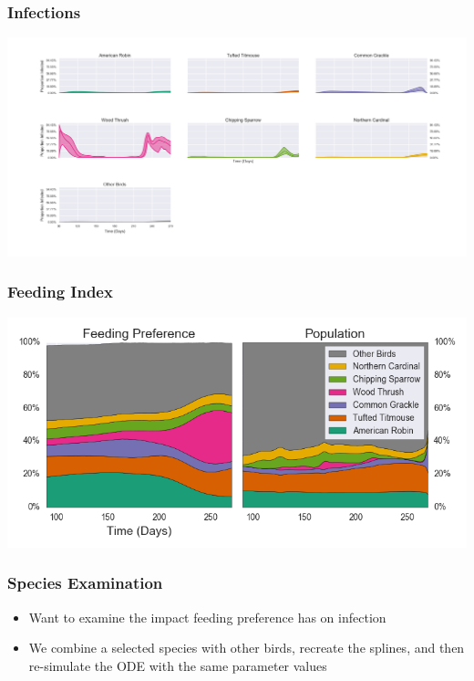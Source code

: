 \documentclass{beamer}
\begin{document}
\begin{frame}
\frametitle{Infections}
\includegraphics[width=\linewidth]{total_infections.png}
\end{frame}

\begin{frame}
\frametitle{Feeding Index}
\includegraphics[width=\linewidth]{total_feeding_index.png}
\end{frame}

\begin{frame}
\frametitle{Species Examination}
\begin{itemize}
\item Want to examine the impact feeding preference has on infection
\item We combine a selected species with other birds, recreate the splines, and then re-simulate the ODE with the same parameter values
\end{itemize}
\end{frame}
\end{document}

